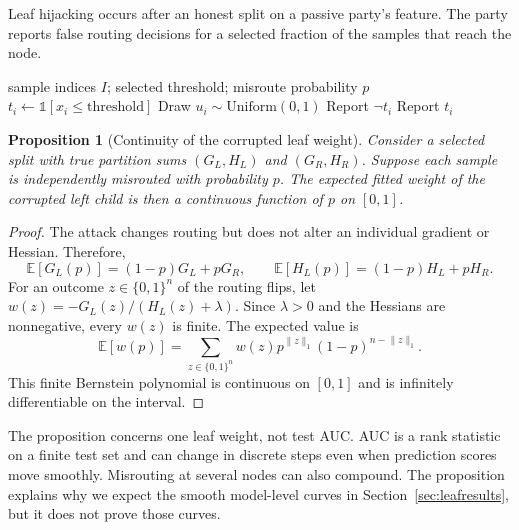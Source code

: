 \documentclass[11pt]{article}
\newtheorem{proposition}{Proposition}
\begin{document}
Leaf hijacking occurs after an honest split on a passive party's feature. The party reports false routing decisions for a selected fraction of the samples that reach the node.

\begin{algorithm}[htbp]
\caption{Leaf misrouting}
\label{alg:leafmisroute}
\begin{algorithmic}[1]
\Require sample indices $I$; selected threshold; misroute probability $p$
  \State $t_i\gets\mathbb{1}[x_i\leq\mathrm{threshold}]$
  \State Draw $u_i\sim\mathrm{Uniform}(0,1)$
    \State Report $\lnot t_i$
  \Else
    \State Report $t_i$
  \EndIf
\EndFor
\end{algorithmic}
\end{algorithm}

\begin{proposition}[Continuity of the corrupted leaf weight]
\label{prop:leafcontinuity}
Consider a selected split with true partition sums $(G_L,H_L)$ and $(G_R,H_R)$. Suppose each sample is independently misrouted with probability $p$. The expected fitted weight of the corrupted left child is then a continuous function of $p$ on $[0,1]$.
\end{proposition}

\begin{proof}
The attack changes routing but does not alter an individual gradient or Hessian. Therefore,
\begin{equation}
\mathbb{E}[G_L(p)]=(1-p)G_L+pG_R, \qquad
\mathbb{E}[H_L(p)]=(1-p)H_L+pH_R.
\label{eq:leafcont}
\end{equation}
For an outcome $z\in\{0,1\}^n$ of the routing flips, let $w(z)=-G_L(z)/(H_L(z)+\lambda)$. Since $\lambda>0$ and the Hessians are nonnegative, every $w(z)$ is finite. The expected value is
\begin{equation}
\mathbb{E}[w(p)]
=\sum_{z\in\{0,1\}^n}
w(z)p^{\lVert z\rVert_1}(1-p)^{n-\lVert z\rVert_1}.
\label{eq:bernstein}
\end{equation}
This finite Bernstein polynomial is continuous on $[0,1]$ and is infinitely differentiable on the interval.
\end{proof}

The proposition concerns one leaf weight, not test AUC. AUC is a rank statistic on a finite test set and can change in discrete steps even when prediction scores move smoothly. Misrouting at several nodes can also compound. The proposition explains why we expect the smooth model-level curves in Section~\ref{sec:leafresults}, but it does not prove those curves.
\end{document}
